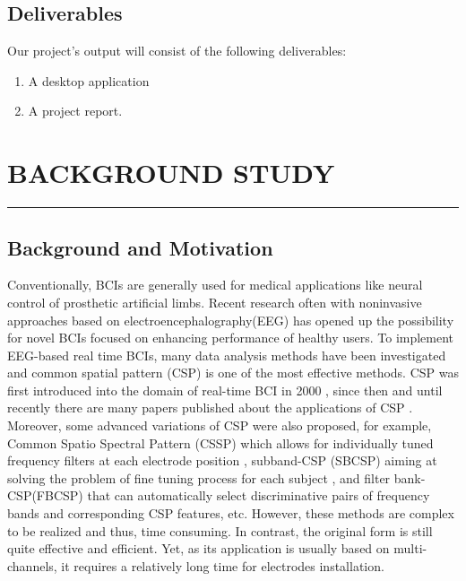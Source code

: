 \documentclass[12pt,a4paper]{report}
\begin{document}
\section{Deliverables}
Our project's output will consist of the following deliverables:
\begin{enumerate}
	\item A desktop application
	\item A project report.
	\end{enumerate}
	\newpage
	\chapter{BACKGROUND STUDY}
	\rule{14.6cm}{.05cm}
	\section{Background and Motivation}
			\justify Conventionally, BCIs are  generally used for medical applications like neural control of prosthetic artificial limbs\cite{1}. Recent research often with noninvasive approaches based on electroencephalography(EEG) has opened up the possibility for novel BCIs focused on enhancing performance of healthy users\cite{2,3,4}.
\justify To implement EEG-based real time BCIs, many data analysis methods have been investigated \cite{5} and common spatial pattern (CSP) is one of the most effective methods. CSP was first introduced into the domain of real-time BCI in 2000 \cite{6,7}, since then and until recently there are many papers published about the applications
of CSP \cite{8,9,10}. Moreover, some advanced variations of CSP were also proposed, for example, Common Spatio Spectral Pattern (CSSP) which allows for individually tuned frequency filters at each electrode position \cite{8}, subband-CSP (SBCSP) aiming at solving the problem of fine	tuning process for each subject \cite{9}, and filter bank-CSP(FBCSP) that can automatically select discriminative pairs of frequency bands and corresponding CSP features\cite{10}, etc. However, these methods are complex to be realized and thus, time consuming. In contrast, the original form is still quite effective and efficient. Yet, as its application is usually based on multi-channels, it requires a relatively long time for electrodes installation.
\end{document}
